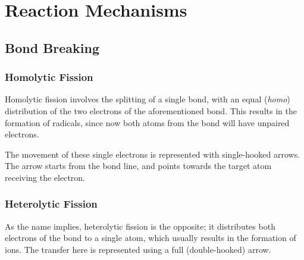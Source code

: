 



\section{Reaction Mechanisms}

\subsection{Bond Breaking}
	\subsubsection{Homolytic Fission}

		Homolytic fission involves the splitting of a single bond, with an equal (\textit{homo}) distribution of the two electrons
		of the aforementioned bond. This results in the formation of radicals, since now both atoms from the bond will have
		unpaired electrons.

		The movement of these single electrons is represented with single-hooked arrows. The arrow starts from the bond line, and points
		towards the target atom receiving the electron.



	\subsubsection{Heterolytic Fission}

		As the name implies, heterolytic fission is the opposite; it distributes both electrons of the bond to a single atom, which
		usually results in the formation of ions. The transfer here is represented using a full (double-hooked) arrow.



